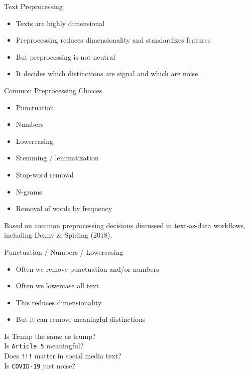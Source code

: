 \documentclass[11pt,aspectratio=43]{beamer}
\newcommand{\term}[1]{\texttt{#1}}
\begin{document}
\begin{frame}{Text Preprocessing}
\begin{itemize}
\item Texts are highly dimensional
\item Preprocessing reduces dimensionality and standardizes features
\item But preprocessing is not neutral
\item It decides which distinctions are signal and which are noise
\end{itemize}
\end{frame}

\begin{frame}{Common Preprocessing Choices}
\begin{itemize}
\item Punctuation
\item Numbers
\item Lowercasing
\item Stemming / lemmatization
\item Stop-word removal
\item N-grams
\item Removal of words by frequency
\end{itemize}
\vspace{.4em}
{\tiny Based on common preprocessing decisions discussed in text-as-data workflows, including Denny \& Spirling (2018).}
\end{frame}

\begin{frame}{Punctuation / Numbers / Lowercasing}
\begin{itemize}
\item Often we remove punctuation and/or numbers
\item Often we lowercase all text
\item This reduces dimensionality
\item But it can remove meaningful distinctions
\end{itemize}
\vspace{.4em}
Is Trump the same as trump?\\
Is \term{Article 5} meaningful?\\
Does \term{!!!} matter in social media text?\\
Is \term{COVID-19} just noise?
\end{frame}
\end{document}
